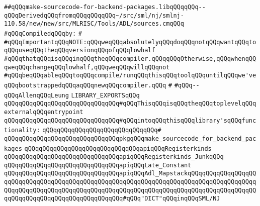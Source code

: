 \label{src/lib/compiler/back/low/tools/arch/make-sourcecode-for-backend-packages.lib}
\verb|##qQQqmake-sourcecode-for-backend-packages.libqQQqqQQq--qQQqDerivedqQQqfromqQQqqQQqqQQq~/src/sml/nj/smlnj-110.58/new/new/src/MLRISC/Tools/ADL/sources.cmqQQq|\newline
\newline
\verb|#qQQqCompiledqQQqby:|\newline
\newline
\verb|#|\newline
\verb|#qQQqImportantqQQqNOTE:qQQqweqQQqabsolutelyqQQqdoqQQqnotqQQqwantqQQqtoqQQquseqQQqtheqQQqversionqQQqofqQQqlowhalf|\newline
\verb|#qQQqthatqQQqisqQQqinqQQqtheqQQqcompiler.qQQqqQQqOtherwise,qQQqwhenqQQqweqQQqchangeqQQqlowhalf,qQQqweqQQqwillqQQqnot|\newline
\verb|#qQQqbeqQQqableqQQqtoqQQqcompile/runqQQqthisqQQqtoolqQQquntilqQQqwe'veqQQqbootstrappedqQQqaqQQqnewqQQqcompiler.qQQq|\newline
\verb|#|\newline
\verb|#qQQq--qQQqAllenqQQqLeung|\newline
\newline
\newline
\verb|LIBRARY_EXPORTSqQQq|\newline
\newline
\verb|qQQqqQQqqQQqqQQqqQQqqQQqqQQqqQQq#qQQqThisqQQqisqQQqtheqQQqtoplevelqQQqexternalqQQqentrypoint|\newline
\verb|qQQqqQQqqQQqqQQqqQQqqQQqqQQqqQQq#qQQqintoqQQqthisqQQqlibrary'sqQQqfunctionality:|\newline
\verb|qQQqqQQqqQQqqQQqqQQqqQQqqQQqqQQq#|\newline
\verb|qQQqqQQqqQQqqQQqqQQqqQQqqQQqqQQqpkgqQQqmake_sourcecode_for_backend_packages|\newline
\newline
\verb|qQQqqQQqqQQqqQQqqQQqqQQqqQQqqQQqapiqQQqRegisterkinds|\newline
\verb|qQQqqQQqqQQqqQQqqQQqqQQqqQQqqQQqapiqQQqRegisterkinds_JunkqQQq|\newline
\verb|qQQqqQQqqQQqqQQqqQQqqQQqqQQqqQQqapiqQQqLate_Constant|\newline
\verb|qQQqqQQqqQQqqQQqqQQqqQQqqQQqqQQqapiqQQqAdl_MapstackqQQqqQQqqQQqqQQqqQQqqQQqqQQqqQQqqQQqqQQqqQQqqQQqqQQqqQQqqQQqqQQqqQQqqQQqqQQqqQQqqQQqqQQqqQQqqQQqqQQqqQQqqQQqqQQqqQQqqQQqqQQqqQQqqQQqqQQqqQQqqQQqqQQqqQQqqQQqqQQqqQQqqQQqqQQqqQQqqQQqqQQqqQQqqQQq#qQQq"DICT"qQQqinqQQqSML/NJ|\newline
